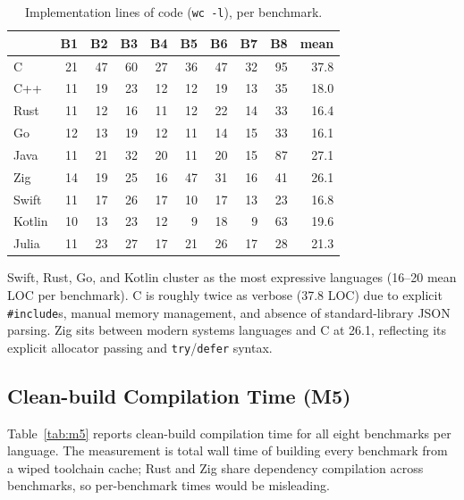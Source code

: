 \documentclass[10pt,conference]{IEEEtran}
\begin{document}
\begin{table}[t]
\caption{Implementation lines of code (\texttt{wc -l}), per benchmark.}
\label{tab:m4}
\centering
\small
\begin{tabular}{l*{8}{r}r}
\toprule
        & \textbf{B1} & \textbf{B2} & \textbf{B3} & \textbf{B4} & \textbf{B5} & \textbf{B6} & \textbf{B7} & \textbf{B8} & \textbf{mean} \\
\midrule
C       & 21 & 47 & 60 & 27 & 36 & 47 & 32 & 95 & 37.8 \\
C++     & 11 & 19 & 23 & 12 & 12 & 19 & 13 & 35 & 18.0 \\
Rust    & 11 & 12 & 16 & 11 & 12 & 22 & 14 & 33 & 16.4 \\
Go      & 12 & 13 & 19 & 12 & 11 & 14 & 15 & 33 & 16.1 \\
Java    & 11 & 21 & 32 & 20 & 11 & 20 & 15 & 87 & 27.1 \\
Zig     & 14 & 19 & 25 & 16 & 47 & 31 & 16 & 41 & 26.1 \\
Swift   & 11 & 17 & 26 & 17 & 10 & 17 & 13 & 23 & 16.8 \\
Kotlin  & 10 & 13 & 23 & 12 & 9 & 18 & 9 & 63 & 19.6 \\
Julia   & 11 & 23 & 27 & 17 & 21 & 26 & 17 & 28 & 21.3 \\
\bottomrule
\end{tabular}
\end{table}

Swift, Rust, Go, and Kotlin cluster as the most expressive
languages (16--20 mean LOC per benchmark). C is roughly twice as
verbose (37.8 LOC) due to explicit \texttt{\#include}s, manual
memory management, and absence of standard-library JSON parsing.
Zig sits between modern systems languages and C at 26.1, reflecting
its explicit allocator passing and \texttt{try}/\texttt{defer}
syntax.

\subsection{Clean-build Compilation Time (M5)}
\label{sec:res-compile}

Table~\ref{tab:m5} reports clean-build compilation time for all
eight benchmarks per language. The measurement is total wall time
of building every benchmark from a wiped toolchain cache; Rust and
Zig share dependency compilation across benchmarks, so per-benchmark
times would be misleading.
\end{document}
